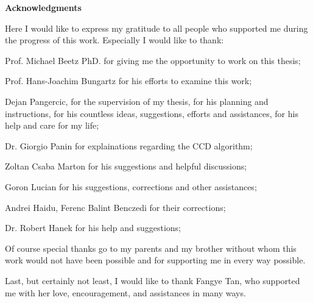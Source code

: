 \clearemptydoublepage
{}
{}        



\vspace*{2cm}

\begin{center}
{\Large \bf Acknowledgments}
\end{center}

\vspace{1cm}




Here I would like to express my gratitude to all people who supported me during the
progress of this work. Especially I would like to thank:

Prof. Michael Beetz PhD. for giving me the opportunity to work on this thesis;

Prof. Hans-Joachim Bungartz for his efforts to examine this work;

Dejan Pangercic, for the supervision of my thesis, for his planning and instructions,
for his countless ideas, suggestions, efforts and assistances, for his help and care for
my life;

Dr. Giorgio Panin for explainations regarding the CCD algorithm;

Zoltan Csaba Marton for his suggestions and helpful discussions;

Goron Lucian for his suggestions, corrections and other assistances;

Andrei Haidu, Ferenc Balint Benczedi for their corrections;


Dr. Robert Hanek for his help and suggestions;

Of course special thanks go to my parents and my brother without whom this work
would not have been possible and for supporting me in every way possible.

Last, but certainly not least, I would like to thank Fangye Tan, who supported me with her
love, encouragement, and assistances in many ways.
